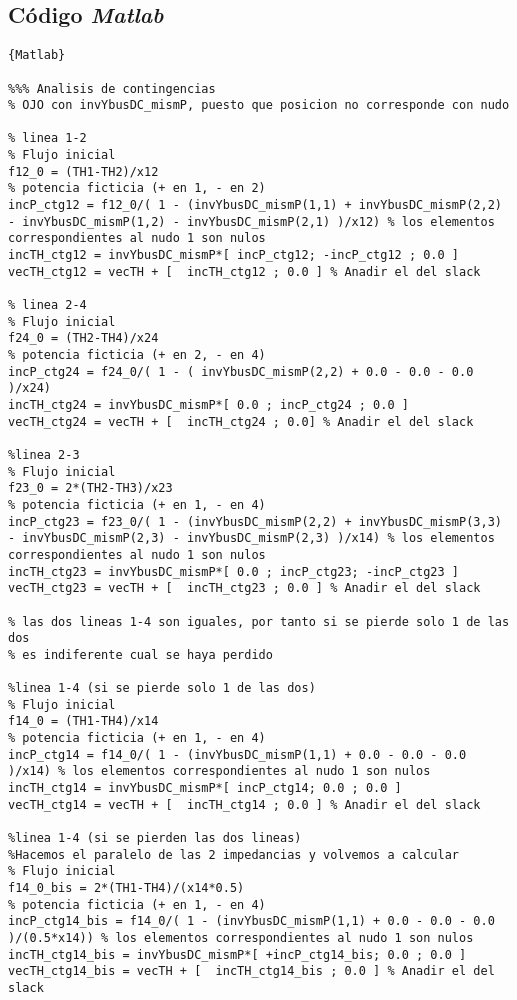 \documentclass[a4paper,10pt,titlepage,oneside]{article}
\begin{document}
{\subsection{Código \textit{Matlab}}
\lstset{language=Matlab, breaklines=true}
\begin{lstlisting}[frame=lines]{Matlab}

%%% Analisis de contingencias
% OJO con invYbusDC_mismP, puesto que posicion no corresponde con nudo

% linea 1-2
% Flujo inicial
f12_0 = (TH1-TH2)/x12
% potencia ficticia (+ en 1, - en 2)
incP_ctg12 = f12_0/( 1 - (invYbusDC_mismP(1,1) + invYbusDC_mismP(2,2) - invYbusDC_mismP(1,2) - invYbusDC_mismP(2,1) )/x12) % los elementos correspondientes al nudo 1 son nulos
incTH_ctg12 = invYbusDC_mismP*[ incP_ctg12; -incP_ctg12 ; 0.0 ] 
vecTH_ctg12 = vecTH + [  incTH_ctg12 ; 0.0 ] % Anadir el del slack

% linea 2-4
% Flujo inicial
f24_0 = (TH2-TH4)/x24
% potencia ficticia (+ en 2, - en 4)
incP_ctg24 = f24_0/( 1 - ( invYbusDC_mismP(2,2) + 0.0 - 0.0 - 0.0 )/x24) 
incTH_ctg24 = invYbusDC_mismP*[ 0.0 ; incP_ctg24 ; 0.0 ] 
vecTH_ctg24 = vecTH + [  incTH_ctg24 ; 0.0] % Anadir el del slack

%linea 2-3 
% Flujo inicial
f23_0 = 2*(TH2-TH3)/x23
% potencia ficticia (+ en 1, - en 4)
incP_ctg23 = f23_0/( 1 - (invYbusDC_mismP(2,2) + invYbusDC_mismP(3,3) - invYbusDC_mismP(2,3) - invYbusDC_mismP(2,3) )/x14) % los elementos correspondientes al nudo 1 son nulos
incTH_ctg23 = invYbusDC_mismP*[ 0.0 ; incP_ctg23; -incP_ctg23 ] 
vecTH_ctg23 = vecTH + [  incTH_ctg23 ; 0.0 ] % Anadir el del slack

% las dos lineas 1-4 son iguales, por tanto si se pierde solo 1 de las dos
% es indiferente cual se haya perdido

%linea 1-4 (si se pierde solo 1 de las dos)
% Flujo inicial
f14_0 = (TH1-TH4)/x14
% potencia ficticia (+ en 1, - en 4)
incP_ctg14 = f14_0/( 1 - (invYbusDC_mismP(1,1) + 0.0 - 0.0 - 0.0 )/x14) % los elementos correspondientes al nudo 1 son nulos
incTH_ctg14 = invYbusDC_mismP*[ incP_ctg14; 0.0 ; 0.0 ] 
vecTH_ctg14 = vecTH + [  incTH_ctg14 ; 0.0 ] % Anadir el del slack

%linea 1-4 (si se pierden las dos lineas)
%Hacemos el paralelo de las 2 impedancias y volvemos a calcular
% Flujo inicial
f14_0_bis = 2*(TH1-TH4)/(x14*0.5)
% potencia ficticia (+ en 1, - en 4)
incP_ctg14_bis = f14_0/( 1 - (invYbusDC_mismP(1,1) + 0.0 - 0.0 - 0.0 )/(0.5*x14)) % los elementos correspondientes al nudo 1 son nulos
incTH_ctg14_bis = invYbusDC_mismP*[ +incP_ctg14_bis; 0.0 ; 0.0 ] 
vecTH_ctg14_bis = vecTH + [  incTH_ctg14_bis ; 0.0 ] % Anadir el del slack



\end{lstlisting}}
\end{document}
